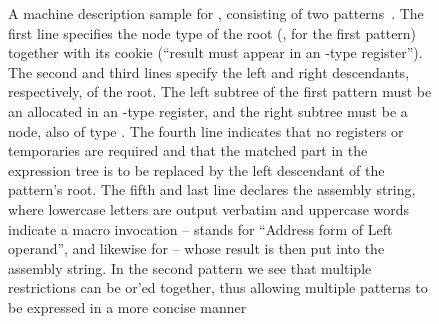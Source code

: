 \begin{figure}
  \centering%
  \begin{lstpage}{106.5mm}%
  \end{lstpage}

  \caption[A machine description sample for ]%
          {%
            A machine description sample for , consisting of
            two patterns~\cite{Johnson:1981}.
            The first line specifies the node type of the root (\cCode*{+=}, for
            the first pattern) together with its cookie (``result must appear in
            an -type register'').
            The second and third lines specify the left and right descendants,
            respectively, of the root.
            The left subtree of the first pattern must be an 
            allocated in an -type register, and the right subtree must
            be a  node, also of type .
            The fourth line indicates that no registers or temporaries are
            required and that the matched part in the expression tree is to be
            replaced by the left descendant of the pattern's root.
            The fifth and last line declares the assembly string, where
            lowercase letters are output verbatim and uppercase words indicate a
            macro invocation --  stands for ``Address form of Left
            operand'', and likewise for  -- whose result is then put
            into the assembly string.
            In the second pattern we see that multiple restrictions can be
            or'ed together, thus allowing multiple patterns to be
            expressed in a more concise manner%
          }
\end{figure}

